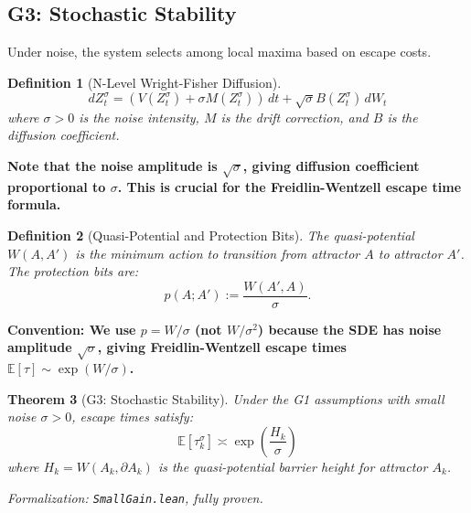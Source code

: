 \documentclass[12pt]{article}
\newtheorem{theorem}{Theorem}[section]
\newtheorem{definition}[theorem]{Definition}
\newcommand{\E}{\mathbb{E}}
\newcommand{\added}[1]{\textbf{#1}}
\begin{document}
\subsection{G3: Stochastic Stability}

Under noise, the system selects among local maxima based on escape costs.

\begin{definition}[N-Level Wright-Fisher Diffusion]
\[
dZ_t^\sigma = (V(Z_t^\sigma) + \sigma M(Z_t^\sigma)) \, dt + \sqrt{\sigma} B(Z_t^\sigma) \, dW_t
\]
where $\sigma > 0$ is the noise intensity, $M$ is the drift correction, and $B$ is the diffusion coefficient.
\end{definition}

\added{\textbf{Note that the noise amplitude is $\sqrt{\sigma}$, giving diffusion coefficient proportional to $\sigma$. This is crucial for the Freidlin-Wentzell escape time formula.}}

\begin{definition}[Quasi-Potential and Protection Bits]
The \emph{quasi-potential} $W(A, A')$ is the minimum action to transition from attractor $A$ to attractor $A'$. The \emph{protection bits} are:
\[
p(A; A') := \frac{W(A', A)}{\sigma}.
\]
\end{definition}

\added{\textbf{Convention: We use $p = W/\sigma$ (not $W/\sigma^2$) because the SDE has noise amplitude $\sqrt{\sigma}$, giving Freidlin-Wentzell escape times $\E[\tau] \sim \exp(W/\sigma)$.}}

\begin{theorem}[G3: Stochastic Stability]
\label{thm:g3}
Under the G1 assumptions with small noise $\sigma > 0$, escape times satisfy:
\[
\E[\tau_k^\sigma] \asymp \exp\left( \frac{H_k}{\sigma} \right)
\]
where $H_k = W(A_k, \partial A_k)$ is the quasi-potential barrier height for attractor $A_k$.
\end{theorem}
\noindent\textit{Formalization: \texttt{SmallGain.lean}, fully proven.}
\end{document}
